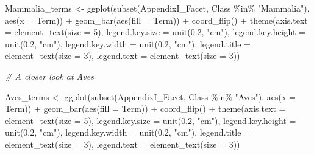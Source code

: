 \documentclass[
  12pt,
]{article}
\newenvironment{Shaded}{\begin{snugshade}}{\end{snugshade}}
\newcommand{\AttributeTok}[1]{\textcolor[rgb]{0.77,0.63,0.00}{#1}}
\newcommand{\CommentTok}[1]{\textcolor[rgb]{0.56,0.35,0.01}{\textit{#1}}}
\newcommand{\DecValTok}[1]{\textcolor[rgb]{0.00,0.00,0.81}{#1}}
\newcommand{\FloatTok}[1]{\textcolor[rgb]{0.00,0.00,0.81}{#1}}
\newcommand{\FunctionTok}[1]{\textcolor[rgb]{0.00,0.00,0.00}{#1}}
\newcommand{\NormalTok}[1]{#1}
\newcommand{\OtherTok}[1]{\textcolor[rgb]{0.56,0.35,0.01}{#1}}
\newcommand{\SpecialCharTok}[1]{\textcolor[rgb]{0.00,0.00,0.00}{#1}}
\newcommand{\StringTok}[1]{\textcolor[rgb]{0.31,0.60,0.02}{#1}}
\begin{document}
\begin{Shaded}
\begin{Highlighting}[]
\NormalTok{Mammalia\_terms }\OtherTok{\textless{}{-}} \FunctionTok{ggplot}\NormalTok{(}\FunctionTok{subset}\NormalTok{(AppendixI\_Facet, Class }\SpecialCharTok{\%in\%} \StringTok{"Mammalia"}\NormalTok{), }\FunctionTok{aes}\NormalTok{(}\AttributeTok{x =}\NormalTok{ Term)) }\SpecialCharTok{+}
    \FunctionTok{geom\_bar}\NormalTok{(}\FunctionTok{aes}\NormalTok{(}\AttributeTok{fill =}\NormalTok{ Term)) }\SpecialCharTok{+} \FunctionTok{coord\_flip}\NormalTok{() }\SpecialCharTok{+} \FunctionTok{theme}\NormalTok{(}\AttributeTok{axis.text =} \FunctionTok{element\_text}\NormalTok{(}\AttributeTok{size =} \DecValTok{5}\NormalTok{),}
    \AttributeTok{legend.key.size =} \FunctionTok{unit}\NormalTok{(}\FloatTok{0.2}\NormalTok{, }\StringTok{"cm"}\NormalTok{), }\AttributeTok{legend.key.height =} \FunctionTok{unit}\NormalTok{(}\FloatTok{0.2}\NormalTok{, }\StringTok{"cm"}\NormalTok{), }\AttributeTok{legend.key.width =} \FunctionTok{unit}\NormalTok{(}\FloatTok{0.2}\NormalTok{,}
        \StringTok{"cm"}\NormalTok{), }\AttributeTok{legend.title =} \FunctionTok{element\_text}\NormalTok{(}\AttributeTok{size =} \DecValTok{3}\NormalTok{), }\AttributeTok{legend.text =} \FunctionTok{element\_text}\NormalTok{(}\AttributeTok{size =} \DecValTok{3}\NormalTok{))}


\CommentTok{\# A closer look at Aves}

\NormalTok{Aves\_terms }\OtherTok{\textless{}{-}} \FunctionTok{ggplot}\NormalTok{(}\FunctionTok{subset}\NormalTok{(AppendixI\_Facet, Class }\SpecialCharTok{\%in\%} \StringTok{"Aves"}\NormalTok{), }\FunctionTok{aes}\NormalTok{(}\AttributeTok{x =}\NormalTok{ Term)) }\SpecialCharTok{+}
    \FunctionTok{geom\_bar}\NormalTok{(}\FunctionTok{aes}\NormalTok{(}\AttributeTok{fill =}\NormalTok{ Term)) }\SpecialCharTok{+} \FunctionTok{coord\_flip}\NormalTok{() }\SpecialCharTok{+} \FunctionTok{theme}\NormalTok{(}\AttributeTok{axis.text =} \FunctionTok{element\_text}\NormalTok{(}\AttributeTok{size =} \DecValTok{5}\NormalTok{),}
    \AttributeTok{legend.key.size =} \FunctionTok{unit}\NormalTok{(}\FloatTok{0.2}\NormalTok{, }\StringTok{"cm"}\NormalTok{), }\AttributeTok{legend.key.height =} \FunctionTok{unit}\NormalTok{(}\FloatTok{0.2}\NormalTok{, }\StringTok{"cm"}\NormalTok{), }\AttributeTok{legend.key.width =} \FunctionTok{unit}\NormalTok{(}\FloatTok{0.2}\NormalTok{,}
        \StringTok{"cm"}\NormalTok{), }\AttributeTok{legend.title =} \FunctionTok{element\_text}\NormalTok{(}\AttributeTok{size =} \DecValTok{3}\NormalTok{), }\AttributeTok{legend.text =} \FunctionTok{element\_text}\NormalTok{(}\AttributeTok{size =} \DecValTok{3}\NormalTok{))}



\end{Highlighting}
\end{Shaded}
\end{document}

